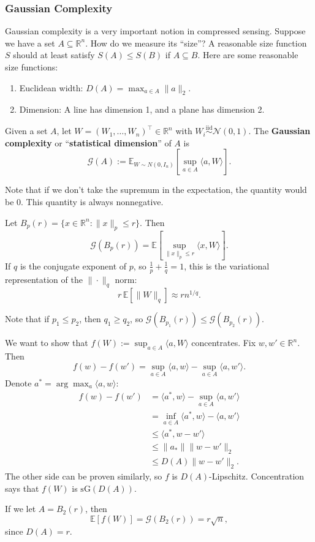 \subsubsection{Gaussian Complexity}
Gaussian complexity is a very important notion in compressed sensing. Suppose we have a set $A \subseteq \mathbb{R}^n$. How do we measure its ``size''? A reasonable size function $S$ should at least satisfy $S(A) \leq S(B)$ if $A \subseteq B$. Here are some reasonable size functions:
\begin{enumerate}
    \item Euclidean width: $D(A) = \max_{a \in A} \|a\|_2$.
    \item Dimension: A line has dimension 1, and a plane has dimension 2.
\end{enumerate}

\begin{defn}
Given a set $A$, let $W = (W_1, \ldots, W_n)^\top \in \mathbb{R}^n$ with $W_i \overset{\text{iid}}{\sim} \mathcal{N}(0,1)$. The \textbf{Gaussian complexity} or ``\textbf{statistical dimension}'' of $A$ is
\[
\mathcal{G}(A) := \mathbb{E}_{W \sim N(0, I_n)} \left[ \sup_{a \in A} \langle a, W \rangle \right].
\]
\end{defn}

Note that if we don't take the supremum in the expectation, the quantity would be 0. This quantity is always nonnegative.

\begin{exam}
Let $B_p(r) = \{x \in \mathbb{R}^n : \|x\|_p \leq r\}$. Then
\[
\mathcal{G}(B_p(r)) = \mathbb{E}\left[ \sup_{\|x\|_p \leq r} \langle x, W \rangle \right].
\]
If $q$ is the conjugate exponent of $p$, so $\frac{1}{p} + \frac{1}{q} = 1$, this is the variational representation of the $\|\cdot\|_q$ norm:
\[
r \, \mathbb{E}[\|W\|_q] \approx r n^{1/q}.
\]
\end{exam}

Note that if $p_1 \leq p_2$, then $q_1 \geq q_2$, so $\mathcal{G}(B_{p_1}(r)) \leq \mathcal{G}(B_{p_2}(r))$.

We want to show that $f(W) := \sup_{a \in A} \langle a, W \rangle$ concentrates. Fix $w, w' \in \mathbb{R}^n$. Then
\[
f(w) - f(w') = \sup_{a \in A} \langle a, w \rangle - \sup_{a \in A} \langle a, w' \rangle.
\]
Denote $a^* = \arg\max_a \langle a, w \rangle$:
\begin{align*}
f(w) - f(w') &= \langle a^*, w \rangle - \sup_{a \in A} \langle a, w' \rangle \\
&= \inf_{a \in A} \langle a^*, w \rangle - \langle a, w' \rangle \\
&\leq \langle a^*, w - w' \rangle \\
&\leq \|a_*\| \|w - w'\|_2 \\
&\leq D(A) \|w - w'\|_2.
\end{align*}
The other side can be proven similarly, so $f$ is $D(A)$-Lipschitz. Concentration says that $f(W)$ is $\mathrm{sG}(D(A))$.

\begin{exam}
If we let $A = B_2(r)$, then
\[
\mathbb{E}[f(W)] = \mathcal{G}(B_2(r)) = r\sqrt{n},
\]
since $D(A) = r$.
\end{exam}
